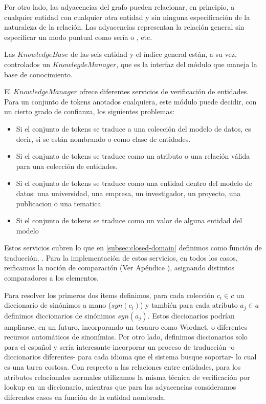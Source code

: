 Por otro lado, las adyacencias del grafo pueden relacionar, en principio, a cualquier entidad con cualquier otra entidad y sin ninguna especificación de la naturaleza de la relación. Las adyacencias representan la relación general  sin especificar un modo puntual como sería  o , etc. 

Las $KnowledgeBase$ de las seis entidad y el índice general están, a su vez, controlados un $KnowlegdeManager$, que es la interfaz del módulo que maneja la base de conocimiento. 

El $KnowledgeManager$ ofrece diferentes servicios de verificación de entidades. Para un conjunto de tokens {\color{red}anotados} cualquiera, este módulo puede decidir, con un cierto grado de confianza, los siguientes problemas:

\begin{itemize}
  \item Si el conjunto de tokens se traduce a una colección del modelo de datos, es decir, si se están nombrando  o  como clase de entidades.
  \item Si el conjunto de tokens se traduce como un atributo o una relación válida para una colección de entidades.
  \item Si el conjunto de tokens se traduce como una entidad dentro del modelo de datos: una universidad, una empresa, un investigador, un proyecto, una publicacion o una tematica
  \item Si el conjunto de tokens se traduce como un valor de alguna entidad del modelo
\end{itemize}

Estos servicios %
 cubren lo que en \ref{subsec:closed-domain} definimos como función de traducción, \tradqd. Para la implementación de estos servicios, en todos los casos, reificamos la noción de comparación (Ver Apéndice ), asignando distintos comparadores a los elementos. 

Para resolver los primeros dos items definimos, para cada colección $c_i \in c$ un diccionario de sinónimos a mano ($syn(c_i)$) y también para cada atributo $a_j \in a$ definimos diccionarios de sinónimos $syn(a_j)$. Estos diccionarios podrían ampliarse, en un futuro, incorporando un tesauro como Wordnet, o diferentes recursos automáticos de sinonímias. Por otro lado, definimos diccionarios solo para el español y sería interesante incorporar un proceso de traducción -o diccionarios diferentes- para cada idioma que el sistema busque soportar- lo cual es una tarea costosa. Con respecto a las relaciones entre entidades, para los atributos relacionales normales utilizamos la misma técnica de verificación por lookup en un diccionario, mientras que para las adyacencias consideramos diferentes casos en función de la entidad nombrada.


